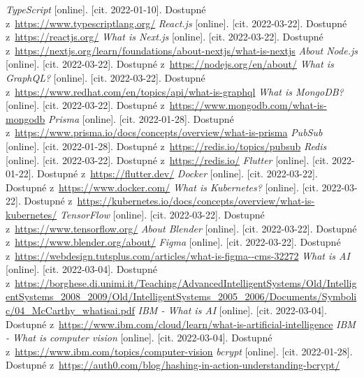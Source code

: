\begin{thebibliography}{99}
     \textit{TypeScript} [online]. [cit. 2022-01-10]. Dostupné z~\url{https://www.typescriptlang.org/}
     \textit{React.js} [online]. [cit. 2022-03-22]. Dostupné z~\url{https://reactjs.org/}
     \textit{What is Next.js} [online]. [cit. 2022-03-22]. Dostupné z~\url{https://nextjs.org/learn/foundations/about-nextjs/what-is-nextjs}
     \textit{About Node.js} [online]. [cit. 2022-03-22]. Dostupné z~\url{https://nodejs.org/en/about/}
     \textit{What is GraphQL?} [online]. [cit. 2022-03-22]. Dostupné z~\url{https://www.redhat.com/en/topics/api/what-is-graphql}
     \textit{What is MongoDB?} [online]. [cit. 2022-03-22]. Dostupné z~\url{https://www.mongodb.com/what-is-mongodb}
     \textit{Prisma} [online]. [cit. 2022-01-28]. Dostupné z~\url{https://www.prisma.io/docs/concepts/overview/what-is-prisma}
     \textit{PubSub} [online]. [cit. 2022-01-28]. Dostupné z~\url{https://redis.io/topics/pubsub}
     \textit{Redis} [online]. [cit. 2022-03-22]. Dostupné z~\url{https://redis.io/}
     \textit{Flutter} [online]. [cit. 2022-01-22]. Dostupné z~\url{https://flutter.dev/}
     \textit{Docker} [online]. [cit. 2022-03-22]. Dostupné z~\url{https://www.docker.com/}
     \textit{What is Kubernetes?} [online]. [cit. 2022-03-22]. Dostupné z~\url{https://kubernetes.io/docs/concepts/overview/what-is-kubernetes/}
     \textit{TensorFlow} [online]. [cit. 2022-03-22]. Dostupné z~\url{https://www.tensorflow.org/}
     \textit{About Blender} [online]. [cit. 2022-03-22]. Dostupné z~\url{https://www.blender.org/about/}
     \textit{Figma} [online]. [cit. 2022-03-22]. Dostupné z~\url{https://webdesign.tutsplus.com/articles/what-is-figma--cms-32272}
     \textit{What is AI} [online]. [cit. 2022-03-04]. Dostupné z~\url{https://borghese.di.unimi.it/Teaching/AdvancedIntelligentSystems/Old/IntelligentSystems_2008_2009/Old/IntelligentSystems_2005_2006/Documents/Symbolic/04_McCarthy_whatisai.pdf}
     \textit{IBM - What is AI} [online]. [cit. 2022-03-04]. Dostupné z~\url{https://www.ibm.com/cloud/learn/what-is-artificial-intelligence}
     \textit{IBM - What is computer vision} [online]. [cit. 2022-03-04]. Dostupné z~\url{https://www.ibm.com/topics/computer-vision}
     \textit{bcrypt} [online]. [cit. 2022-01-28]. Dostupné z~\url{https://auth0.com/blog/hashing-in-action-understanding-bcrypt/}

\end{thebibliography}
